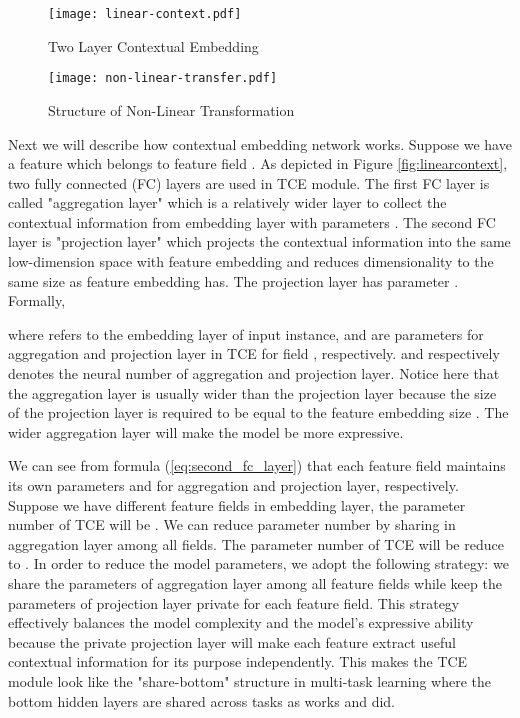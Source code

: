 \documentclass[sigconf]{acmart}
\begin{document}
\begin{figure}
\begin{minipage}[t]{0.49\linewidth}
  \centering
  \texttt{[image: linear-context.pdf]}
  \caption{Two Layer  Contextual Embedding}
  \label{fig:linearcontext}
\end{minipage}\begin{minipage}[t]{0.49\linewidth}
  \centering
  \texttt{[image: non-linear-transfer.pdf]}
  \caption{Structure of Non-Linear Transformation}
  \label{fig:transfer}
\end{minipage}
\end{figure}


Next we will describe how contextual embedding network works. Suppose we have a feature  which belongs to feature field . As depicted in Figure \ref{fig:linearcontext}, two fully connected (FC) layers are used in TCE module. The first FC layer is called "aggregation layer" which is a relatively wider layer to collect the contextual information from embedding layer with parameters . The second FC layer is "projection layer" which projects the contextual information into the same low-dimension space with feature embedding and reduces dimensionality to the same size as feature embedding has. The projection layer has parameter . Formally,

where  refers to the embedding layer of input instance,  and  are parameters for aggregation and projection layer in TCE for field , respectively.  and  respectively denotes the neural number of aggregation and projection layer. Notice here that the aggregation layer is usually wider than the projection layer because the size of the projection layer is required to be equal to the feature embedding size . The wider aggregation layer will make the model be more  expressive.


We can see from formula (\ref{eq:second_fc_layer}) that each feature field  maintains its own parameters  and  for aggregation and projection layer, respectively. Suppose we have  different feature fields in embedding layer, the parameter number of TCE will be . We can reduce parameter number by sharing  in aggregation layer among all fields. The parameter number of TCE will be reduce to . In order to reduce the model parameters, we adopt the following strategy: we share the parameters of aggregation layer among all feature fields while keep the parameters of projection layer private for each feature field. This strategy effectively balances the model complexity and  the model's expressive ability because the private projection layer will make each feature extract useful contextual information for its purpose independently. This makes the TCE module look like the "share-bottom" structure in multi-task learning where the bottom hidden layers are shared across tasks as works \cite{caruana1997multitask} and \cite{caruana1993multitask} did.
\end{document}
